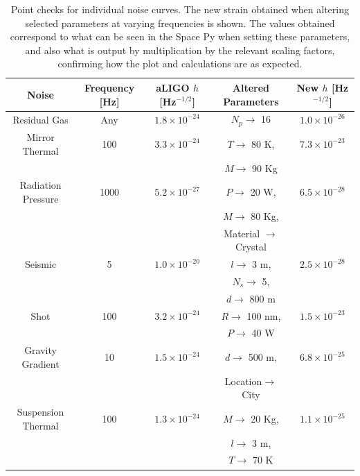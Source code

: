 \documentclass{article}
\begin{document}
     \begin{table}[h]
     \centering
     \captionsetup{width=0.9\textwidth}
      \caption{Point checks for individual noise curves. The new
        strain obtained when altering selected parameters at varying
        frequencies is shown. The values obtained correspond to what
        can be seen in the Space Py when setting these parameters, and
        also what is output by multiplication by the relevant scaling
        factors, confirming how the plot and calculations are as
        expected.}
      \label{tab::checks}
    \begin{tabular}{ |c|c|c|c|c| }
     \hline
     \textbf{Noise} & \textbf{Frequency [Hz]} & \textbf{aLIGO} $h$ [Hz$^{-1/2}$] &\textbf{Altered Parameters}    & \textbf{New} $h$ [Hz$^{-1/2}$]  \\     \hline
     {Residual Gas}  & Any & $1.8 \times 10^{-24}$ & $N_p \rightarrow$ 16 & $1.0\times 10^{-26}$ \\ 
     \hline
     {Mirror Thermal}  & 100 & $3.3 \times 10^{-24}$ & $T \rightarrow$ 80 K, & $7.3\times 10^{-23}$\\
       &  &  & $M \rightarrow$ 90 Kg &  \\ 
     \hline
     {Radiation Pressure}  & 1000 &  $5.2\times 10^{-27}$ & $P \rightarrow$ 20 W, & $6.5\times 10^{-28}$\\ 
      &  &   & $M \rightarrow$ 80 Kg, &  \\ 
      &  &   & Material $\rightarrow$ Crystal &  \\ 
     \hline
     {Seismic}  & 5 & $1.0 \times 10^{-20}$ & $l\rightarrow$ 3 m,  & $2.5 \times 10^{-28}$  \\ 
      &  &  & $N_s\rightarrow$ 5,  &  \\ 
      &  &  & $d\rightarrow$ 800 m  &  \\ 
     \hline
     {Shot}  & 100 & $3.2 \times 10^{-24}$ & $R\rightarrow$ 100 nm,  & $1.5 \times 10^{-23}$ \\ 
     &  &  & $P\rightarrow$ 40 W  & \\ 
     \hline
    {Gravity Gradient}  & 10 & $1.5 \times 10^{-24}$ & $d\rightarrow$ 500 m,  & $6.8 \times 10^{-25}$ \\ 
    &  &  & Location$\rightarrow$ City  &  \\ 
    \hline
    {Suspension Thermal}  & 100 & $1.3 \times 10^{-24}$ & $M\rightarrow$ 20 Kg,  & $1.1 \times 10^{-25}$ \\  
    &  &  & $l\rightarrow$ 3 m,  &  \\ 
    &  &  & $T\rightarrow$ 70 K  &  \\ 
    \hline
    \end{tabular}
    \end{table}
\end{document}

